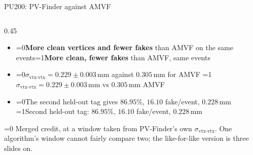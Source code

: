 \documentclass[xcolor=table,aspectratio=169]{beamer}
\providecommand{\talkbuild}{0}
\newcommand{\readingonly}[1]{\ifnum\talkbuild=0\relax#1\fi}
\newcommand{\talkonly}[1]{\ifnum\talkbuild=1\relax#1\fi}
\begin{document}
\begin{frame}{PU200: PV-Finder against AMVF}
\begin{columns}[c]
\begin{column}{0.45\linewidth}
            \begin{itemize}\setlength\itemsep{0.25em}
                \item \readingonly{\textbf{More clean vertices and fewer fakes} than AMVF on the
                    same events}\talkonly{\textbf{More clean, fewer fakes} than AMVF,
                    same events}
                \item \readingonly{$\sigma_{\text{vtx-vtx}} = \mathbf{0.229 \pm 0.003}$\,mm against
                    $0.305$\,mm for AMVF}%
                    \talkonly{$\sigma_{\text{vtx-vtx}} = \mathbf{0.229 \pm 0.003}$\,mm
                    vs $0.305$\,mm AMVF}
                \item \readingonly{The second held-out tag gives $86.95\%$, $16.10$ fake/event,
                    $0.228$\,mm}%
                    \talkonly{Second held-out tag: $86.95\%$, $16.10$ fake/event,
                    $0.228$\,mm}
            \end{itemize}
            \readingonly{\vspace{0.5em}
            {\scriptsize\textcolor{black!55}{Merged credit, at a window taken from
            PV-Finder's own $\sigma_{\text{vtx-vtx}}$. One algorithm's window cannot
            fairly compare two; the like-for-like version is three slides on.}}}
        \end{column}
    \end{columns}
\end{frame}
\end{document}
